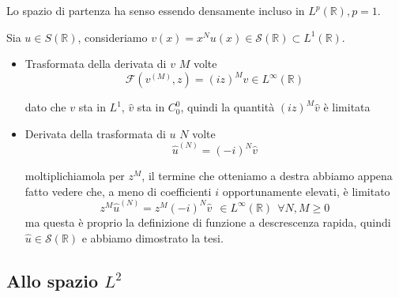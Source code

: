 Lo spazio di partenza ha senso essendo densamente incluso in $L^{p}(\mathbb{R}) ,p=1$.

Sia $u\in S(\mathbb{R})$, consideriamo $v( x) =x^{N} u( x) \in \mathcal{S}(\mathbb{R}) \subset L^{1}(\mathbb{R})$.
\begin{itemize}
\item Trasformata della derivata di $v$ $M$ volte\begin{equation*}
\mathcal{F}\left( v^{( M)} ,z\right) =( iz)^{M}\hat{v} \in L^{\infty }(\mathbb{R})
\end{equation*}

dato che $v$ sta in $L^{1}$, $\hat{v}$ sta in $C^{0}_{0}$, quindi la quantità $( iz)^{M}\hat{v}$ è limitata
\item Derivata della trasformata di $u$ $N$ volte\begin{equation*}
\hat{u}^{( N)} =( -i)^{N}\hat{v}
\end{equation*}

moltiplichiamola per $z^{M}$, il termine che otteniamo a destra abbiamo appena fatto vedere che, a meno di coefficienti $i$ opportunamente elevati, è limitato\begin{equation*}
z^{M}\hat{u}^{( N)} =z^{M}( -i)^{N}\hat{v} \ \ \boxed{\in L^{\infty }(\mathbb{R})} \ \ \forall N,M\geqslant 0
\end{equation*}ma questa è proprio la definizione di funzione a descrescenza rapida, quindi $\hat{u} \in \mathcal{S}(\mathbb{R})$ e abbiamo dimostrato la tesi.\begin{equation*}
\end{equation*}
\end{itemize}
\subsection{Allo spazio $L^{2}$}

